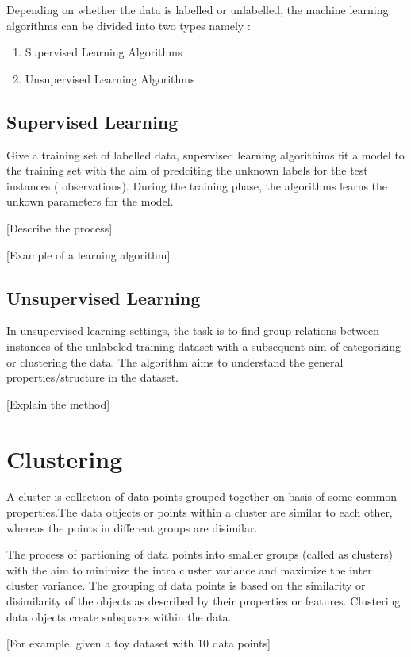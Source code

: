 Depending on whether the data is labelled or unlabelled, the machine learning algorithms can be divided into two types namely :
\begin{enumerate}
	\item Supervised Learning Algorithms
	\item Unsupervised Learning Algorithms
\end{enumerate}

\subsection{Supervised Learning}
Give a training set of labelled data, supervised learning algorithims fit a model to the training set with the aim of predciting the unknown labels for the test instances ( observations). During the training phase, the algorithms learns the unkown parameters for the model.

[Describe the process]

[Example of a learning algorithm]

\subsection{Unsupervised Learning}

In unsupervised learning settings, the task is to find group relations between instances of the unlabeled training dataset with a subsequent aim of categorizing or clustering the data. The algorithm aims to understand the general properties/structure in the dataset.

[Explain the method]

\section{Clustering}
A cluster is collection of data points grouped together on basis of some common properties.The data objects or points within a cluster are similar to each other, whereas the points in different groups are disimilar.

The process of partioning of data points into smaller groups (called as clusters) with the aim to minimize the intra cluster variance and maximize the inter cluster variance. The grouping of data points is based on the similarity or disimilarity of the objects as described by their properties or features. Clustering data objects create subspaces within the data.

[For example, given a toy dataset with 10 data points]


